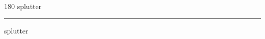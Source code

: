
\begin{frame}
\begin{center}
\begin{turn}{180}
{\fontsize{2.5cm}{1em}\selectfont splutter}
\end{turn}
\vspace{1em}\par  
\hrule
\vspace{1em}\par  
{\fontsize{2.5cm}{1em}\selectfont splutter}
\end{center}
\end{frame}
